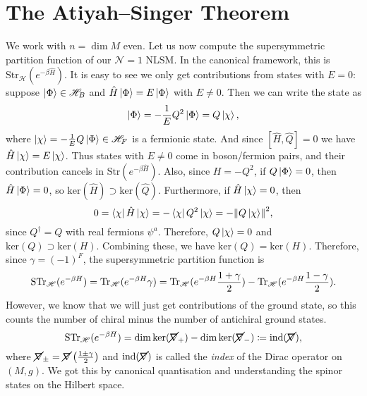 \section{The Atiyah--Singer Theorem}%
\label{sec:the_atiyah_singer_theorem}

We work with $n = \dim M$ even.
Let us now compute the supersymmetric partition function of our $\mathcal{N} = 1$ NLSM. In the canonical framework, this is $\text{Str}_{\mathscr{H}} \left( e^{-\beta \hat{H}} \right)$.
It is easy to see we only get contributions from states with $E = 0$: suppose $\ket{\Phi} \in \mathscr{H}_B$ and $\hat{H} \ket{\Phi} = E \ket{\Phi}$ with $E \neq 0$. Then we can write the state as
\begin{equation}
  \ket{\Phi} = -\frac{1}{E} Q^2 \ket{\Phi} = Q \ket{\chi}, 
\end{equation}
where $\ket{\chi} = -\frac{1}{E} Q \ket{\Phi} \in \mathscr{H}_F$ is a fermionic state. And since $[\hat{H}, \hat{Q}] = 0$ we have $\hat{H} \ket{\chi} = E \ket{\chi}$.
Thus states with $E \neq 0$ come in boson/fermion pairs, and their contribution cancels in $\text{Str}( e^{-\beta \hat{H}} )$.
Also, since $H = -Q^2$, if $Q \ket{\Phi}  =0$, then $\hat{H} \ket{\Phi} = 0$, so $\text{ker}(\hat{H}) \supset \text{ker}(\hat{Q})$. Furthermore, if $\hat{H} \ket{\chi} = 0$, then
\begin{equation}
  0 = \bra{\chi} \hat{H} \ket{\chi} = -\bra{\chi} Q^2 \ket{\chi} = - \norm{Q \ket{\chi}}^2,
\end{equation}
since $Q^{\dagger} = Q$ with real fermions $\psi^a$. Therefore, $Q \ket{\chi} = 0$ and $\text{ker}(Q) \supset \text{ker}(H)$.
Combining these, we have $\text{ker}(Q) = \text{ker}(H)$. Therefore, since $\gamma = (-1)^F$, the supersymmetric partition function is
\begin{equation}
  \text{STr}_{\mathscr{H}} (e^{-\beta H}) = \Tr_{\mathscr{H}}(e^{-\beta H} \gamma) = \Tr_{\mathscr{H}}(e^{-\beta H} \frac{1 + \gamma}{2}) - \Tr_{\mathscr{H}}(e^{-\beta H} \frac{1 - \gamma}{2}).
\end{equation}
However, we know that we will just get contributions of the ground state, so this counts the number of chiral minus the number of antichiral ground states.
\begin{equation}
  \label{eq:10-pint}
  \text{STr}_{\mathscr{H}} (e^{-\beta H}) = \dim \ker (\cancel{\nabla}_+) - \dim \ker (\cancel{\nabla}_-) \coloneqq \text{ind}(\cancel{\nabla}),
\end{equation}
where $\cancel{\nabla}_\pm = \cancel{\nabla} \left( \frac{1 \pm \gamma}{2} \right)$ and $\text{ind} (\cancel{\nabla})$ is called the \emph{index} of the Dirac operator on $(M, g)$.
We got this by canonical quantisation and understanding the spinor states on the Hilbert space.

